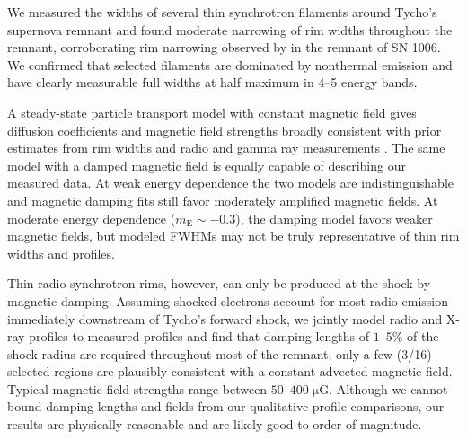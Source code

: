 \documentclass[manuscript]{aastex}  %
\newcommand*{\mt}{\mathrm}
\newcommand*{\unit}[1]{\;\mt{#1}}  %
\newcommand*{\mE}{m_\mt{E}}
\newcommand*{\muG}{\unit{\mu G}}
\begin{document}
We measured the widths of several thin synchrotron filaments around Tycho's
supernova remnant and found moderate narrowing of rim widths throughout the
remnant, corroborating rim narrowing observed by \citet{ressler2014} in the
remnant of SN 1006.  We confirmed that selected filaments are dominated by
nonthermal emission and have clearly measurable full widths at half maximum in
4--5 energy bands.

A steady-state particle transport model with constant magnetic field gives
diffusion coefficients and magnetic field strengths broadly consistent with
prior estimates from rim widths \citep[e.g.,][]{parizot2006, rettig2012} and
radio and gamma ray measurements \citep{acciari2011, morlino2012}.  The same
model with a damped magnetic field is equally capable of describing our
measured data.  At weak energy dependence the two models are indistinguishable
and magnetic damping fits still favor moderately amplified magnetic fields.  At
moderate energy dependence ($\mE \sim -0.3$), the damping model favors weaker
magnetic fields, but modeled FWHMs may not be truly representative of thin rim
widths and profiles.

Thin radio synchrotron rims, however, can only be produced at the shock by
magnetic damping.  Assuming shocked electrons account for most radio emission
immediately downstream of Tycho's forward shock, we jointly model radio and
X-ray profiles to measured profiles and find that damping lengths of $1$--$5$\%
of the shock radius are required throughout most of the remnant; only a few
(3/16) selected regions are plausibly consistent with a constant advected
magnetic field.  Typical magnetic field strengths range between $50$--$400
\muG$.  Although we cannot bound damping lengths and fields from our
qualitative profile comparisons, our results are physically reasonable and are
likely good to order-of-magnitude.

%

\acknowledgments
\end{document}
